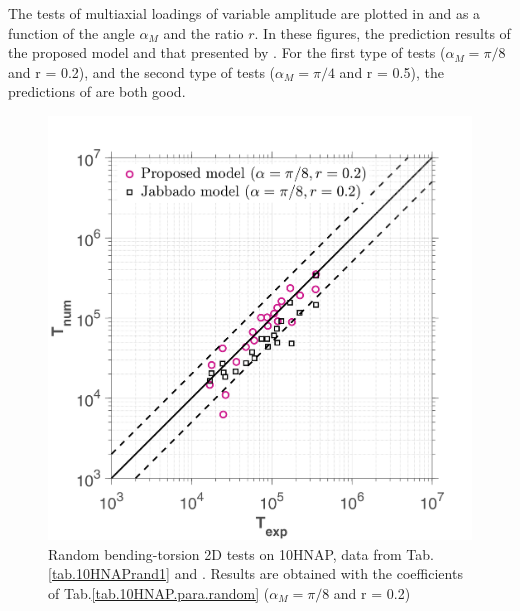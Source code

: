 The tests of multiaxial loadings of variable amplitude are plotted in  and  as a function of the angle $\alpha_{M}$ and the ratio $r$. In these figures, the prediction results of the proposed model and that presented by \cite{carpinteri2003multiaxial}. For the first type of tests ($\alpha_{M} = \pi/8$ and r = 0.2), and the second type of tests ($\alpha_{M} = \pi/4$ and r = 0.5), the predictions of \cite{carpinteri2003multiaxial} are both good. 
\begin{figure}[!h]
	\centering
	\includegraphics[width=\textwidth]{figures//HNAP_random_r02_error.png} 
	\caption{Random bending-torsion 2D tests on 10HNAP, data from Tab.\ref{tab.10HNAPrand1} and \cite{jabbado:pastel-00002116}. Results are obtained with the coefficients of Tab.\ref{tab.10HNAP.para.random} ($\alpha_{M} = \pi/8$ and r = 0.2)}
	\label{fig.10HNAP_random02}
\end{figure}

